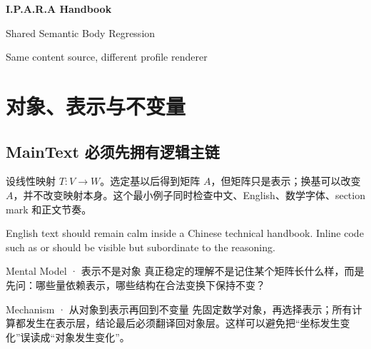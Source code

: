 
\begin{titlepage}
  \centering
  \vspace*{0.18\textheight}
  {\Huge\bfseries\sffamily I.P.A.R.A Handbook\par}
  \vspace{0.7em}
  {\Large Shared Semantic Body Regression\par}
  \vspace{1.5em}
  {\small Same content source, different profile renderer\par}
\end{titlepage}
\tableofcontents

\section{对象、表示与不变量}

\subsection{MainText 必须先拥有逻辑主链}

设线性映射 $T\colon V\to W$。选定基以后得到矩阵 $A$，但矩阵只是表示；换基可以改变 $A$，并不改变映射本身。这个最小例子同时检查中文、English、数学字体、section mark 和正文节奏。


English text should remain calm inside a Chinese technical handbook. Inline code such as  or  should be visible but subordinate to the reasoning.

\begin{mentalmodel}{Mental Model · 表示不是对象}
真正稳定的理解不是记住某个矩阵长什么样，而是先问：哪些量依赖表示，哪些结构在合法变换下保持不变？
\end{mentalmodel}

\begin{mechanism}{Mechanism · 从对象到表示再回到不变量}
先固定数学对象，再选择表示；所有计算都发生在表示层，结论最后必须翻译回对象层。这样可以避免把“坐标发生变化”误读成“对象发生变化”。
\end{mechanism}

\begin{processchain}
\end{processchain}

